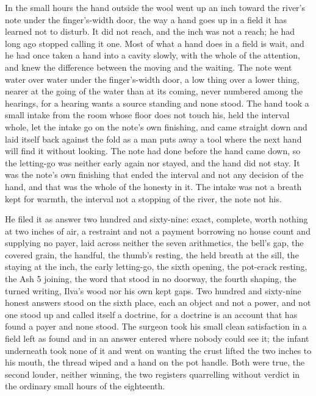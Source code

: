 In the small hours the hand outside the wool went up an inch toward the river's note under the finger's-width door, the way a hand goes up in a field it has learned not to disturb. It did not reach, and the inch was not a reach; he had long ago stopped calling it one. Most of what a hand does in a field is wait, and he had once taken a hand into a cavity slowly, with the whole of the attention, and knew the difference between the moving and the waiting. The note went water over water under the finger's-width door, a low thing over a lower thing, nearer at the going of the water than at its coming, never numbered among the hearings, for a hearing wants a source standing and none stood. The hand took a small intake from the room whose floor does not touch his, held the interval whole, let the intake go on the note's own finishing, and came straight down and laid itself back against the fold as a man puts away a tool where the next hand will find it without looking. The note had done before the hand came down, so the letting-go was neither early again nor stayed, and the hand did not stay. It was the note's own finishing that ended the interval and not any decision of the hand, and that was the whole of the honesty in it. The intake was not a breath kept for warmth, the interval not a stopping of the river, the note not his.

He filed it as answer two hundred and sixty-nine: exact, complete, worth nothing at two inches of air, a restraint and not a payment borrowing no house count and supplying no payer, laid across neither the seven arithmetics, the bell's gap, the covered grain, the handful, the thumb's resting, the held breath at the sill, the staying at the inch, the early letting-go, the sixth opening, the pot-crack resting, the Ash 5 joining, the word that stood in no doorway, the fourth shaping, the turned writing, Ilva's wood nor his own kept gaps. Two hundred and sixty-nine honest answers stood on the sixth place, each an object and not a power, and not one stood up and called itself a doctrine, for a doctrine is an account that has found a payer and none stood. The surgeon took his small clean satisfaction in a field left as found and in an answer entered where nobody could see it; the infant underneath took none of it and went on wanting the crust lifted the two inches to his mouth, the thread wiped and a hand on the pot handle. Both were true, the second louder, neither winning, the two registers quarrelling without verdict in the ordinary small hours of the eighteenth.

